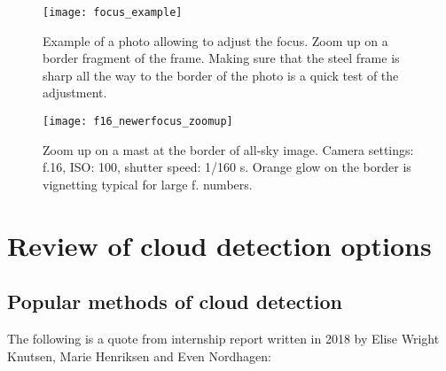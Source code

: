 \documentclass[]{book}
\begin{document}
	\begin{figure}
		\centering
		\texttt{[image: focus\_example]}
		\label{fig: focus_example}
		\caption{Example of a photo allowing to adjust the focus. Zoom up on a border fragment of the frame. Making sure that the steel frame is sharp all the way to the border of the photo is a quick test of the adjustment.}
	\end{figure}
	
	\begin{figure}
		\centering
		\texttt{[image: f16\_newerfocus\_zoomup]}
		\label{fig: focus_mast}
		\caption{Zoom up on a mast at the border of all-sky image. Camera settings: f.16, ISO: 100, shutter speed: 1/160 s. Orange glow on the border is vignetting typical for large f. numbers.}
	\end{figure}

	\section{Review of cloud detection options}
		\subsection{Popular methods of cloud detection}
		
		The following is a quote from internship report written in 2018 by Elise Wright Knutsen, Marie Henriksen and Even Nordhagen:
		
\end{document}
